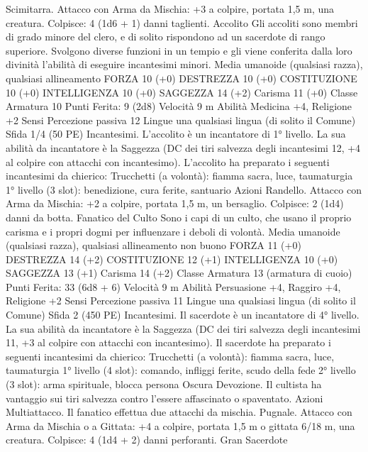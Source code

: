 \begin{multicols}{2}
Scimitarra. Attacco con Arma da Mischia: +3 a colpire, portata
1,5 m, una creatura.
Colpisce: 4 (1d6 + 1) danni taglienti.
Accolito
Gli accoliti sono membri di grado minore del clero, e di
solito rispondono ad un sacerdote di rango superiore.
Svolgono diverse funzioni in un tempio e gli viene
conferita dalla loro divinità l’abilità di eseguire
incantesimi minori.
Media umanoide (qualsiasi razza), qualsiasi allineamento
FORZA 10 (+0)
DESTREZZA 10 (+0)
COSTITUZIONE 10 (+0)
INTELLIGENZA 10 (+0)
SAGGEZZA 14 (+2)
Carisma 11 (+0)
Classe Armatura 10
\hspace*{0pt}\hfill{Punti Ferita}: 9 (2d8)
Velocità 9 m
Abilità Medicina +4, Religione +2
Sensi Percezione passiva 12
Lingue una qualsiasi lingua (di solito il Comune)
Sfida 1/4 (50 PE)
Incantesimi. L’accolito è un incantatore di 1° livello. La sua
abilità da incantatore è la Saggezza (DC dei tiri salvezza degli
incantesimi 12, +4 al colpire con attacchi con incantesimo).
L’accolito ha preparato i seguenti incantesimi da chierico:
Trucchetti (a volontà): fiamma sacra, luce, taumaturgia
1° livello (3 slot): benedizione, cura ferite, santuario
Azioni
Randello. Attacco con Arma da Mischia: +2 a colpire, portata
1,5 m, un bersaglio.
Colpisce: 2 (1d4) danni da botta.
Fanatico del Culto
Sono i capi di un culto, che usano il proprio carisma e i
propri dogmi per influenzare i deboli di volontà.
Media umanoide (qualsiasi razza), qualsiasi allineamento non
buono
FORZA 11 (+0)
DESTREZZA 14 (+2)
COSTITUZIONE 12 (+1)
INTELLIGENZA 10 (+0)
SAGGEZZA 13 (+1)
Carisma 14 (+2)
Classe Armatura 13 (armatura di cuoio)
\hspace*{0pt}\hfill{Punti Ferita}: 33 (6d8 + 6)
Velocità 9 m
Abilità Persuasione +4, Raggiro +4, Religione +2
Sensi Percezione passiva 11
Lingue una qualsiasi lingua (di solito il Comune)
Sfida 2 (450 PE)
Incantesimi. Il sacerdote è un incantatore di 4° livello. La sua
abilità da incantatore è la Saggezza (DC dei tiri salvezza degli
incantesimi 11, +3 al colpire con attacchi con incantesimo). Il
sacerdote ha preparato i seguenti incantesimi da chierico:
Trucchetti (a volontà): fiamma sacra, luce, taumaturgia
1° livello (4 slot): comando, infliggi ferite, scudo della fede
2° livello (3 slot): arma spirituale, blocca persona
Oscura Devozione. Il cultista ha vantaggio sui tiri salvezza
contro l’essere affascinato o spaventato.
Azioni
Multiattacco. Il fanatico effettua due attacchi da mischia.
Pugnale. Attacco con Arma da Mischia o a Gittata: +4 a colpire,
portata 1,5 m o gittata 6/18 m, una creatura.
Colpisce: 4 (1d4 + 2) danni perforanti.
Gran Sacerdote

\end{multicols}
